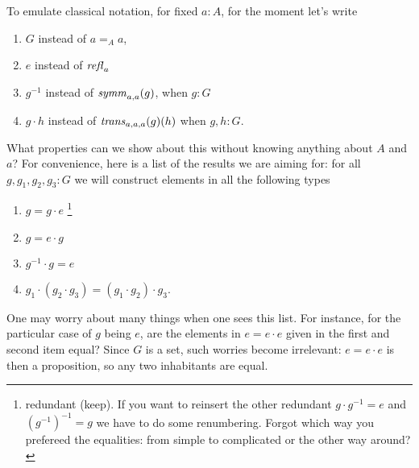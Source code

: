  To emulate classical notation, for fixed $a:A$,  for the moment let's write
 \begin{enumerate}
 \item $G$ instead of $a=_Aa$,
 \item $e$ instead of $\mathop{{\it refl}_{a}}{}$
 \item $g^{-1}$ instead of $\mathop{\mathit{symm}}_{a,a}(g)$, when $g:G$
 \item $g\cdot h$ instead of $\mathop{\mathit{trans}}_{a,a,a}(g)(h)$ when $g,h:G$.
 \end{enumerate}
 What properties can we show about this without knowing anything about $A$ and $a$? For convenience, here is a list of the results we are aiming for: for all $g,g_1,g_2,g_3:G$ we will construct elements in all the following types
 \begin{enumerate}
 \item $g=g\cdot e$ \footnote{redundant (keep).  If you want to reinsert the other redundant $g\cdot g^{-1}=e$ and $(g^{-1})^{-1}=g$ we have to do some renumbering.  Forgot which way you prefereed the equalities: from simple to complicated or the other way around?}
 \item $g=e\cdot g$
 \item $g^{-1}\cdot g=e$
 \item $g_1\cdot(g_2\cdot g_3)=(g_1\cdot g_2)\cdot g_3$.
 \end{enumerate}
 \begin{remark}
   One may worry about many things when one sees this list.  For instance, for the particular case of $g$ being $e$, are the elements in $e=e\cdot e$ given in the first and second item equal?  Since $G$ is a set, such worries become irrelevant: $e=e\cdot e$ is then a proposition, so any two inhabitants are equal.
 \end{remark}

